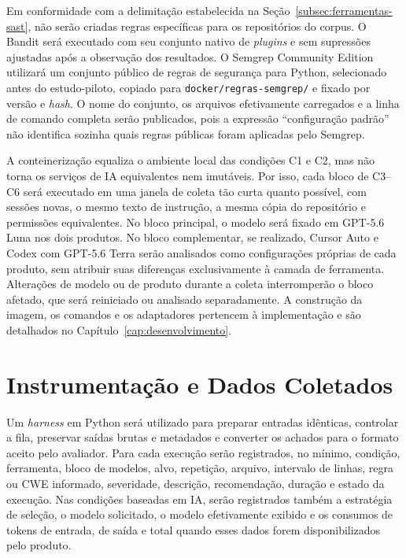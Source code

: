 Em conformidade com a delimitação estabelecida na Seção~\ref{subsec:ferramentas-sast}, não serão criadas regras específicas para os repositórios do corpus. O Bandit será executado com seu conjunto nativo de \textit{plugins} e sem supressões ajustadas após a observação dos resultados. O Semgrep Community Edition utilizará um conjunto público de regras de segurança para Python, selecionado antes do estudo-piloto, copiado para \texttt{docker/regras-semgrep/} e fixado por versão e \textit{hash}. O nome do conjunto, os arquivos efetivamente carregados e a linha de comando completa serão publicados, pois a expressão ``configuração padrão'' não identifica sozinha quais regras públicas foram aplicadas pelo Semgrep.

A conteinerização equaliza o ambiente local das condições C1 e C2, mas não torna os serviços de IA equivalentes nem imutáveis. Por isso, cada bloco de C3--C6 será executado em uma janela de coleta tão curta quanto possível, com sessões novas, o mesmo texto de instrução, a mesma cópia do repositório e permissões equivalentes. No bloco principal, o modelo será fixado em GPT-5.6 Luna nos dois produtos. No bloco complementar, se realizado, Cursor Auto e Codex com GPT-5.6 Terra serão analisados como configurações próprias de cada produto, sem atribuir suas diferenças exclusivamente à camada de ferramenta. Alterações de modelo ou de produto durante a coleta interromperão o bloco afetado, que será reiniciado ou analisado separadamente. A construção da imagem, os comandos e os adaptadores pertencem à implementação e são detalhados no Capítulo~\ref{cap:desenvolvimento}.

\section{Instrumentação e Dados Coletados}\label{subsec:implementacao-harness}

Um \textit{harness} em Python será utilizado para preparar entradas idênticas, controlar a fila, preservar saídas brutas e metadados e converter os achados para o formato aceito pelo avaliador. Para cada execução serão registrados, no mínimo, condição, ferramenta, bloco de modelos, alvo, repetição, arquivo, intervalo de linhas, regra ou CWE informado, severidade, descrição, recomendação, duração e estado da execução. Nas condições baseadas em IA, serão registrados também a estratégia de seleção, o modelo solicitado, o modelo efetivamente exibido e os consumos de tokens de entrada, de saída e total quando esses dados forem disponibilizados pelo produto.

